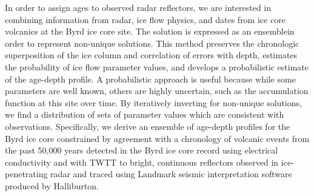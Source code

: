 


In order to assign ages to observed radar reflectors, we are interested in combining information from radar, ice flow physics, and dates from ice core volcanics at the Byrd ice core site. The solution is expressed as an ensemblein order to represent non-unique solutions.  This method preserves the chronologic superposition of the ice column and correlation of errors with depth, estimates the probability of ice flow parameter values, and develops a probabilistic estimate of the age-depth profile. A probabilistic approach is useful because while some parameters are well known, others are highly uncertain, such as the accumulation function at this site over time. By iteratively inverting for non-unique solutions, we find a distribution of sets of parameter values which are consistent with observations. Specifically, we derive an ensemble of age-depth profiles for the Byrd ice core constrained by agreement with a chronology of volcanic events from the past 50,000 years detected in the Byrd ice core record using electrical conductivity \citep{hammer1997} and with TWTT to bright, continuous reflectors observed in ice-penetrating radar \citep{holt2006,young2012,morse2002} and traced using Landmark seismic interpretation software produced by Halliburton.



